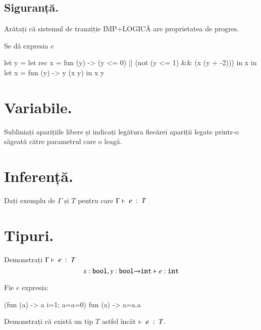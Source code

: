 \documentclass[addpoints,12pt,a4paper,answers]{exam}
\begin{document}
\begin{questions}
\begin{parts}
\part[1] {\bf Siguranță. } Arătați că sistemul de tranziție IMP+LOGICĂ are proprietatea de progres.
\end{parts}

Se dă expresia $e$
\begin{asciiml}
let y = let rec x = 
          fun (y) -> (y <= 0) || (not (y <= 1) && (x (y + -2)))
        in x
in let x = fun (y) -> y (x y)
   in x y
\end{asciiml}
\begin{parts}
\part[2] {\bf Variabile. } Subliniați aparițiile libere și indicați legătura fiecărei apariții legate printr-o săgeată către parametrul care o leagă.
\part[1] {\bf Inferență.}  Dați exemplu de $\Gamma$ și $T$ pentru care $\tjud{e}{T}$
\part[2] {\bf Tipuri. } Demonstrați $\tjud{e}{T}$
\[x:{\Sbool},y:{\Sbool \rightarrow \Sint} \vdash e : {\Sint}\]
\end{parts}

Fie $e$ expresia:
\begin{asciiml}
(fun (a) ->  a {i=1; a={a=0}}) fun (a) ->  {a=a.a}
\end{asciiml}

 Demonstrați că există un tip $T$ astfel încât $\tjud[]{e}{T}$.
\end{questions}

\end{document}
